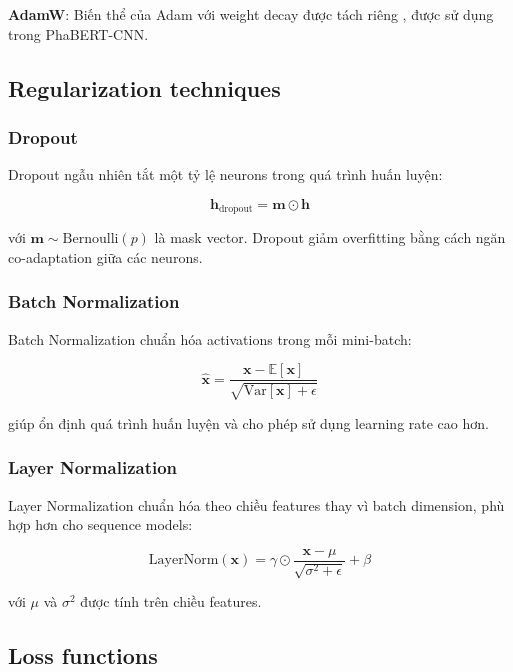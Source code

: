 \textbf{AdamW}: Biến thể của Adam với weight decay được tách riêng \cite{loshchilov2017decoupled}, được sử dụng trong PhaBERT-CNN.

\subsection{Regularization techniques}

\subsubsection{Dropout}

Dropout ngẫu nhiên tắt một tỷ lệ neurons trong quá trình huấn luyện:

\begin{equation}
\mathbf{h}_{\text{dropout}} = \mathbf{m} \odot \mathbf{h}
\end{equation}

với $\mathbf{m} \sim \text{Bernoulli}(p)$ là mask vector. Dropout giảm overfitting bằng cách ngăn co-adaptation giữa các neurons.

\subsubsection{Batch Normalization}

Batch Normalization chuẩn hóa activations trong mỗi mini-batch:

\begin{equation}
\hat{\mathbf{x}} = \frac{\mathbf{x} - \mathbb{E}[\mathbf{x}]}{\sqrt{\text{Var}[\mathbf{x}] + \epsilon}}
\end{equation}

giúp ổn định quá trình huấn luyện và cho phép sử dụng learning rate cao hơn.

\subsubsection{Layer Normalization}

Layer Normalization chuẩn hóa theo chiều features thay vì batch dimension, phù hợp hơn cho sequence models:

\begin{equation}
\text{LayerNorm}(\mathbf{x}) = \gamma \odot \frac{\mathbf{x} - \mu}{\sqrt{\sigma^2 + \epsilon}} + \beta
\end{equation}

với $\mu$ và $\sigma^2$ được tính trên chiều features.

\subsection{Loss functions}

